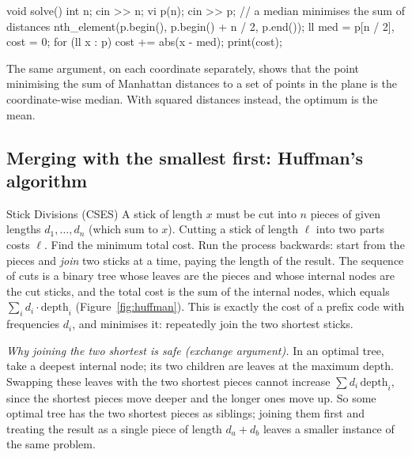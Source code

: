 \begin{code}
void solve() {
    int n;
    cin >> n;
    vi p(n);
    cin >> p;
    // a median minimises the sum of distances
    nth_element(p.begin(), p.begin() + n / 2, p.end());
    ll med = p[n / 2], cost = 0;
    for (ll x : p) cost += abs(x - med);
    print(cost);
}
\end{code}

The same argument, on each coordinate separately, shows that the point minimising the sum of Manhattan distances to a set of
points in the plane is the coordinate-wise median. With squared distances instead, the optimum is the mean.

\subsection{Merging with the smallest first: Huffman's algorithm}

\begin{problem}{Stick Divisions (CSES)}
A stick of length $x$ must be cut into $n$ pieces of given lengths $d_1, \ldots, d_n$ (which sum to $x$). Cutting a stick of
length $\ell$ into two parts costs $\ell$. Find the minimum total cost.
\solution Run the process backwards: start from the pieces and \emph{join} two sticks at a time, paying the length of the
result. The sequence of cuts is a binary tree whose leaves are the pieces and whose internal nodes are the cut sticks, and the
total cost is the sum of the internal nodes, which equals $\sum_i d_i \cdot \mathrm{depth}_i$ (Figure~\ref{fig:huffman}).
This is exactly the cost of a prefix code with frequencies $d_i$, and  minimises it: repeatedly
join the two shortest sticks.
\end{problem}

\emph{Why joining the two shortest is safe (exchange argument).} In an optimal tree, take a deepest internal node; its two
children are leaves at the maximum depth. Swapping these leaves with the two shortest pieces cannot increase
$\sum d_i\,\mathrm{depth}_i$, since the shortest pieces move deeper and the longer ones move up. So some optimal tree has the
two shortest pieces as siblings; joining them first and treating the result as a single piece of length $d_a + d_b$ leaves a
smaller instance of the same problem.

